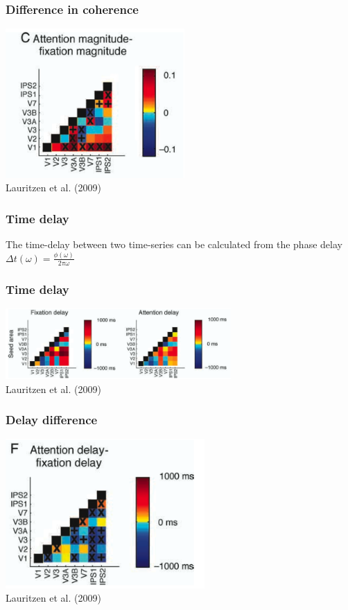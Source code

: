 \documentclass{beamer}
\begin{document}
\begin{frame}
\frametitle{Difference in coherence}
\includegraphics[height=5.7cm]{figures/lauritzen5}
\\
\hfill 
Lauritzen et al. (2009)
\end{frame}


\begin{frame}
\frametitle{Time delay}
The time-delay between two time-series can be calculated from the phase delay 
\\ 
\pause
\vspace{1cm}
$\Delta t (\omega) = \frac{\phi(\omega)}{2 \pi \omega}$
\end{frame}

\begin{frame}
\frametitle{Time delay}
\includegraphics[height=2.7cm]{figures/lauritzen6}
\\
\hfill 
Lauritzen et al. (2009)
\end{frame}

\begin{frame}
\frametitle{Delay difference}
\includegraphics[height=5.7cm]{figures/lauritzen7}
\\
\hfill 
Lauritzen et al. (2009)
\end{frame}
\end{document}
